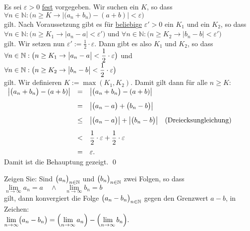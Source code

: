 \proof
Es sei $\varepsilon > 0$ \underline{fest} vorgegeben.  Wir suchen ein $K$, so dass
\\[0.2cm]
\hspace*{1.3cm}
$\forall n \in \mathbb{N}:\bigl( n \geq K \rightarrow \bigl| \bigl(a_n + b_n\bigr) - (a + b)\bigr| < \varepsilon \bigr)$
\\[0.2cm]
gilt.  Nach Voraussetzung gibt es f\"ur \underline{beliebi}g\underline{e} $\varepsilon' > 0$ ein $K_1$ und ein $K_2$, so dass
\\[0.2cm]
\hspace*{1.3cm}
$\forall n \in \mathbb{N}:\bigl(n \geq K_1 \rightarrow \bigl| a_n - a \bigr| < \varepsilon'\bigr)$ 
\quad \mbox{und} \quad
$\forall n \in \mathbb{N}:\bigl( n \geq K_2 \rightarrow \bigl| b_n - b \bigr| < \varepsilon'\bigr)$
\\[0.2cm]
gilt.  Wir setzen nun $\varepsilon' := \frac{1}{2} \cdot \varepsilon$.  Dann gibt es also $K_1$ und
$K_2$, so dass
\\[0.2cm]
\hspace*{1.3cm}
$\displaystyle\forall n \in \mathbb{N}:\bigl(n \geq K_1 \rightarrow \bigl| a_n - a \bigr| < \frac{1}{2}\cdot\varepsilon\bigr)$ 
   \quad \mbox{und} \quad
\\[0.2cm]
\hspace*{1.3cm}
$\displaystyle\forall n \in \mathbb{N}:\bigl(n \geq K_2 \rightarrow \bigl| b_n - b \bigr| < \frac{1}{2}\cdot\varepsilon\bigr)$
\\[0.2cm]
gilt.  Wir definieren $K := \max(K_1,K_2)$.  Damit gilt dann f\"ur alle $n \geq K$:
\\[0.2cm]
\hspace*{1.3cm}
$
\begin{array}{lcll}
  \bigl| \bigl(a_n + b_n\bigr) - (a + b) \bigr|  
 & = & \bigl| \bigl(a_n + b_n\bigr) - (a + b) \bigr| \\[0.3cm]
 & = & \bigl| \bigl(a_n - a\bigr) +  \bigl(b_n - b\bigr) \bigr| \\[0.3cm]
 & \leq & \bigl| \bigl(a_n - a\bigr) \bigr| +  \bigl|\bigl(b_n - b\bigr) \bigr| 
        & \mbox{(Dreiecksungleichung)} \\[0.3cm]
 & < & \displaystyle\frac{1}{2}\cdot \varepsilon + \frac{1}{2} \cdot \varepsilon \\[0.3cm]
 & = &  \varepsilon. 
\end{array}
$
\\[0.2cm]
Damit ist die Behauptung gezeigt. \qed

\exercise
Zeigen Sie:
Sind $\bigl(a_n\bigr)_{n\in\mathbb{N}}$ und $\bigl(b_n\bigr)_{n\in\mathbb{N}}$ zwei Folgen, so dass
\\[0.2cm]
\hspace*{1.3cm}
$ \lim\limits_{n\rightarrow\infty} a_n = a \quad \wedge \quad \lim\limits_{n\rightarrow\infty} b_n = b $
\\[0.2cm]
gilt, dann konvergiert die Folge $\bigl(a_n - b_n\bigr)_{n\in\mathbb{N}}$ gegen den Grenzwert $a-b$, in
Zeichen:
\\[0.2cm]
\hspace*{1.3cm}
$ \lim\limits_{n\rightarrow\infty} \bigl(a_n - b_n\bigr) = 
   \Bigl(\lim\limits_{n\rightarrow\infty} a_n\Bigr) -\Bigl(\lim\limits_{n\rightarrow\infty} b_n\Bigr).
$
\eox  

